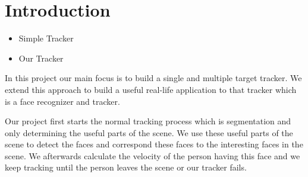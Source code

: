 \section{Introduction}
\begin{itemize}
\item Simple Tracker \\ 

\item Our Tracker\\ 


\end{itemize}

In this project our main focus is to build a single and multiple target tracker. We extend this approach to build a useful real-life application to that tracker which is a face recognizer and tracker.

Our project first starts the normal tracking process which is segmentation and only determining the useful parts of the scene. We use these useful parts of the scene to detect the faces and correspond these faces to the interesting faces in the scene. We afterwards calculate the velocity of the person having this face and we keep tracking until the person leaves the scene or our tracker fails.